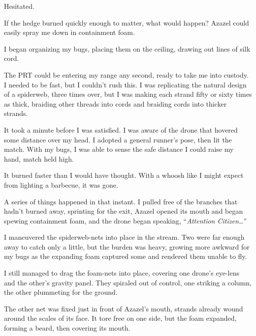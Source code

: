 Hesitated.



If the hedge burned quickly enough to matter, what would happen?  Azazel could easily spray me down in containment foam.



I began organizing my bugs, placing them on the ceiling, drawing out lines of silk cord.



The PRT could be entering my range any second, ready to take me into custody.  I needed to be fast, but I couldn't rush this.  I was replicating the natural design of a spiderweb, three times over, but I was making each strand fifty or sixty times as thick, braiding other threads into cords and braiding cords into thicker strands.



It took a minute before I was satisfied.  I was aware of the drone that hovered some distance over my head.  I adopted a general runner's pose, then lit the match.  With my bugs, I was able to sense the safe distance I could raise my hand, match held high.



It burned faster than I would have thought.  With a whoosh like I might expect from lighting a barbecue, it was gone.



A series of things happened in that instant.  I pulled free of the branches that hadn't burned away, sprinting for the exit,  Azazel opened its mouth and began spewing containment foam, and the drone began speaking, ``\emph{Attention Citizen\ldots}''



I maneuvered the spiderweb-nets into place in the stream.  Two were far enough away to catch only a little, but the burden was heavy, growing more awkward for my bugs as the expanding foam captured some and rendered them unable to fly.



I still managed to drag the foam-nets into place, covering one drone's eye-lens and the other's gravity panel.  They spiraled out of control, one striking a column, the other plummeting for the ground.



The other net was fixed just in front of Azazel's mouth, strands already wound around the scales of its face.  It tore free on one side, but the foam expanded, forming a beard, then covering its mouth.



